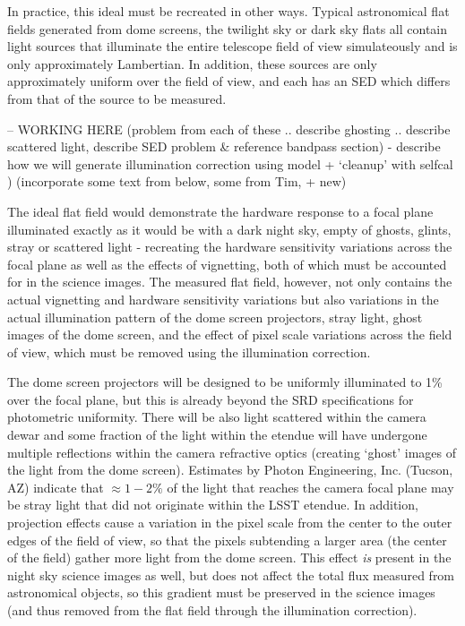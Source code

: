 \documentclass[12pt,preprint]{aastex}
\begin{document}
In practice, this ideal must be recreated in other ways. Typical
astronomical flat fields generated from dome screens, the twilight sky
or dark sky flats all contain light sources that illuminate the entire
telescope field of view simulateously and is only approximately Lambertian. 
In addition, these sources are only approximately uniform over the field 
of view, and each has an SED which differs from that of the source to be
measured. 

-- WORKING HERE (problem from each of these .. describe ghosting .. describe scattered light,
describe SED problem \& reference bandpass section) - describe how we will generate 
illumination correction using model + `cleanup' with selfcal )
(incorporate some text from below, some from Tim, + new) 



The ideal flat field would demonstrate the hardware response to a
focal plane illuminated exactly as it would be with a dark night sky,
empty of ghosts, glints, stray or scattered light - recreating the
hardware sensitivity variations across the focal plane as well as the
effects of vignetting, both of which must be accounted for in the
science images. The measured flat field, however, not only contains
the actual vignetting and hardware sensitivity variations but also
variations in the actual illumination pattern of the dome screen
projectors, stray light, ghost images of the dome screen, and the
effect of pixel scale variations across the field of view, which must
be removed using the illumination correction. 

The dome screen projectors will be designed to be uniformly
illuminated to 1\% over the focal plane, but this is already beyond
the SRD specifications for photometric uniformity.  There will be also
light scattered within the camera dewar and some fraction of the light
within the etendue will have undergone multiple reflections within the
camera refractive optics (creating `ghost' images of the light from
the dome screen). Estimates by Photon Engineering, Inc. (Tucson, AZ)
indicate that $\approx1-2\%$ of the light that reaches the camera
focal plane may be stray light that did not originate within the LSST
etendue. In addition, projection effects cause a variation in the
pixel scale from the center to the outer edges of the field of view,
so that the pixels subtending a larger area (the center of the field)
gather more light from the dome screen. This effect {\it is} present
in the night sky science images as well, but does not affect the total
flux measured from astronomical objects, so this gradient must be
preserved in the science images (and thus removed from the flat field
through the illumination correction). 
\end{document}
